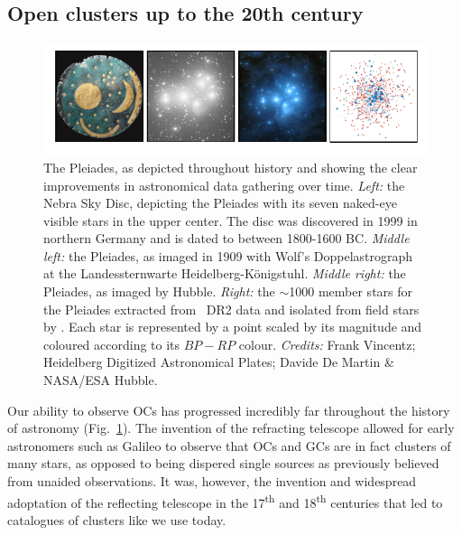 \subsection{Open clusters up to the 20th century}

\begin{figure}[t]
	\includegraphics[width=\textwidth]{fig/c1/pleiades.pdf}
	\caption[The Pleiades as depicted throughout history]{The Pleiades, as depicted throughout history and showing the clear improvements in astronomical data gathering over time. \emph{Left:} the Nebra Sky Disc, depicting the Pleiades with its seven naked-eye visible stars in the upper center. The disc was discovered in 1999 in northern Germany and is dated to between 1800-1600 BC. \emph{Middle left:} the Pleiades, as imaged in 1909 with Wolf's Doppelastrograph at the Landessternwarte Heidelberg-Königstuhl. \emph{Middle right:} the Pleiades, as imaged by Hubble. \emph{Right:} the $\sim$1000 member stars for the Pleiades extracted from \gaia\ DR2 data and isolated from field stars by \cite{cantat-gaudin_characterising_2018}. Each star is represented by a point scaled by its magnitude and coloured according to its $BP-RP$ colour. \emph{Credits:} Frank Vincentz; Heidelberg Digitized Astronomical Plates; Davide De Martin \& NASA/ESA Hubble.}
	\label{fig:intro:history:pleiades}
\end{figure}

Our ability to observe OCs has progressed incredibly far throughout the history of astronomy (Fig.~\ref{fig:intro:history:pleiades}). The invention of the refracting telescope allowed for early astronomers such as Galileo to observe that OCs and GCs are in fact clusters of many stars, as opposed to being dispered single sources as previously believed from unaided observations. It was, however, the invention and widespread adoptation of the reflecting telescope in the 17\textsuperscript{th} and 18\textsuperscript{th} centuries that led to catalogues of clusters like we use today.

